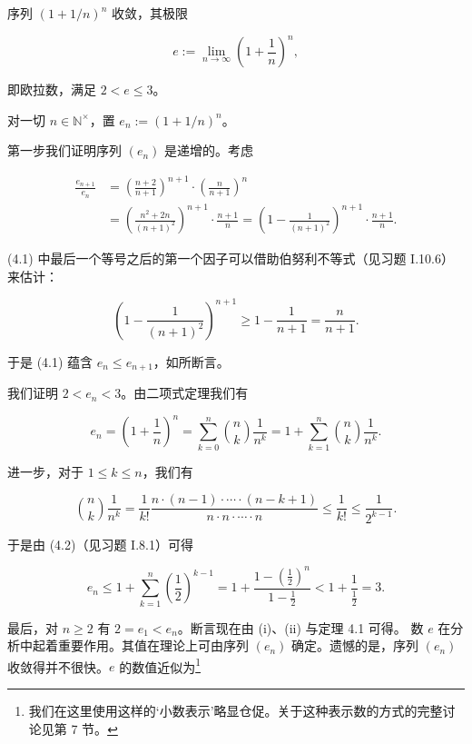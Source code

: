 \begin{example}
\begin{items}
\item

序列  $ (1+1/n)^{n} $ 收敛，其极限

\[
e:=\lim_{n\to\infty}\left(1+\frac{1}{n}\right)^{n},
\]

即欧拉数，满足  $ 2 < e \leq 3 $。

\proofhead
对一切  $ n \in \mathbb{N}^\times $，置  $ e_n := (1 + 1/n)^n $。

\begin{subitems}
\item

第一步我们证明序列  $ (e_{n}) $ 是递增的。考虑

\begin{equation}
\begin{aligned}
\frac{e_{n+1}}{e_{n}}&=\left(\frac{n+2}{n+1}\right)^{n+1}\cdot\left(\frac{n}{n+1}\right)^{n}\\&=\left(\frac{n^{2}+2n}{(n+1)^{2}}\right)^{n+1}\cdot\frac{n+1}{n}=\left(1-\frac{1}{(n+1)^{2}}\right)^{n+1}\cdot\frac{n+1}{n}.
\end{aligned}
\end{equation}

(4.1) 中最后一个等号之后的第一个因子可以借助伯努利不等式（见习题 I.10.6）来估计：

\[
\left(1-\frac{1}{(n+1)^{2}}\right)^{n+1}\geq1-\frac{1}{n+1}=\frac{n}{n+1}.
\]

于是 (4.1) 蕴含  $ e_n \leq e_{n+1} $，如所断言。

\item

我们证明 $2 < e_n < 3$。由二项式定理我们有

\begin{equation}
e_{n}=\left(1+\frac{1}{n}\right)^{n}=\sum_{k=0}^{n}\binom{n}{k}\frac{1}{n^{k}}=1+\sum_{k=1}^{n}\binom{n}{k}\frac{1}{n^{k}}.
\end{equation}

进一步，对于  $ 1 \leq k \leq n $，我们有

\[
{n\choose k}\frac{1}{n^{k}}=\frac{1}{k!}\frac{n\cdot(n-1)\cdot\cdots\cdot(n-k+1)}{n\cdot n\cdot\cdots\cdot n}\leq\frac{1}{k!}\leq\frac{1}{2^{k-1}}.
\]

于是由 (4.2)（见习题 I.8.1）可得

\[
e_{n}\leq1+\sum_{k=1}^{n}\left(\frac{1}{2}\right)^{k-1}=1+\frac{1-\left(\frac{1}{2}\right)^{n}}{1-\frac{1}{2}}<1+\frac{1}{\frac{1}{2}}=3.
\]

最后，对 $n \geq 2$ 有 $2 = e_1 < e_n$。断言现在由 (i)、(ii) 与定理 4.1 可得。
数  $ e $ 在分析中起着重要作用。其值在理论上可由序列  $ (e_n) $ 确定。遗憾的是，序列  $ (e_n) $ 收敛得并不很快。$ e $ 的数值近似为\footnote{我们在这里使用这样的‘小数表示’略显仓促。关于这种表示数的方式的完整讨论见第 7 节。}


\end{subitems}
\end{items}
\end{example}
